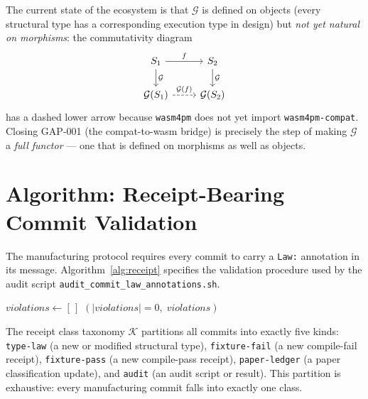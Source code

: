 The current state of the ecosystem is that $\mathcal{G}$ is defined on
objects (every structural type has a corresponding execution type in design)
but \emph{not yet natural on morphisms}: the commutativity diagram
\[
  \begin{tikzcd}
    S_1 \arrow[r, "f"] \arrow[d, "\mathcal{G}"] & S_2 \arrow[d, "\mathcal{G}"] \\
    \mathcal{G}(S_1) \arrow[r, "\mathcal{G}(f)", dashed] & \mathcal{G}(S_2)
  \end{tikzcd}
\]
has a dashed lower arrow because \texttt{wasm4pm} does not yet import
\texttt{wasm4pm-compat}. Closing GAP-001 (the compat-to-wasm bridge) is
precisely the step of making $\mathcal{G}$ a \emph{full functor} --- one that is
defined on morphisms as well as objects.

\section{Algorithm: Receipt-Bearing Commit Validation}
\label{sec:conc-receipt-algo}

The manufacturing protocol requires every commit to carry a \texttt{Law:}
annotation in its message. Algorithm~\ref{alg:receipt} specifies the
validation procedure used by the audit script
\texttt{audit\_commit\_law\_annotations.sh}.

\begin{algorithm}[H]
\caption{Receipt-Bearing Commit Validation}
\label{alg:receipt}
\DontPrintSemicolon
{}
\BlankLine
$\mathit{violations} \leftarrow [\,]$\;
\Return $(|\mathit{violations}| = 0,\; \mathit{violations})$\;
\end{algorithm}

The receipt class taxonomy $\mathcal{K}$ partitions all commits into exactly
five kinds: \texttt{type-law} (a new or modified structural type),
\texttt{fixture-fail} (a new compile-fail receipt), \texttt{fixture-pass}
(a new compile-pass receipt), \texttt{paper-ledger} (a paper classification
update), and \texttt{audit} (an audit script or result). This partition is
exhaustive: every manufacturing commit falls into exactly one class.

